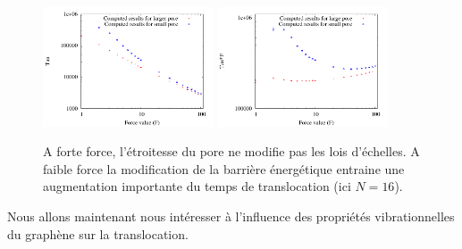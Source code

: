 \documentclass[a4paper,11pt]{article}
\begin{document}
\begin{figure}[H]
\begin{center}
\includegraphics[width=0.45\textwidth]{translocporedifn.pdf} \includegraphics[width=0.45\textwidth]{translocporedif.pdf}

\caption{A forte force, l'étroitesse du pore ne modifie pas les lois d'échelles. A faible force la modification de la barrière énergétique entraine une augmentation importante du temps de translocation (ici $N=16$).}
\label{both}
\end{center}
\end{figure}

Nous allons maintenant nous intéresser à l'influence des propriétés vibrationnelles du graphène sur la translocation.







\end{document}

